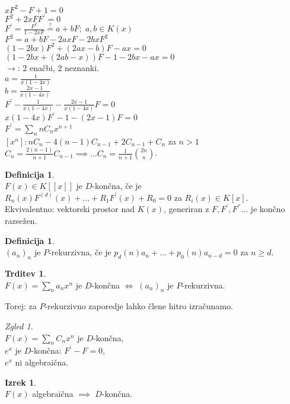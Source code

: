 \documentclass[a4paper, 12pt]{book}
\theoremstyle{definition}
\newtheorem{defn}[counter]{Definicija}
\newtheorem{claim}[counter]{Trditev}
\newtheorem{theorem}[counter]{Izrek}
\theoremstyle{remark}
\newtheorem*{exmp}{Zgled}
\begin{document}
$x F^2 - F + 1 = 0$ \\
$F^2 + 2 x F F^{'} = 0$ \\
$F^{'} = \frac{F^2}{1 - 2 x F} \stackrel{?}{=} a + bF; \; a, b \in K(x)$ \\
$F^2 = a + b F - 2 a x F - 2 b x F^2$ \\
$(1 - 2 b x) F^2 + (2 a x - b) F - a x = 0$ \\
$(1 - 2 b x + (2 a b - x)) F - 1 - 2 b x - a x = 0$ \\
$\to$: 2 enačbi, 2 neznanki. \\
$a = \frac{1}{x (1-4x)}$ \\
$b = \frac{2x-1}{x (1-4x)}$ \\
$F^{'} - \frac{1}{x (1-4x)} - \frac{2x-1}{x (1-4x)} F = 0$ \\
$x (1-4x) F^{'} - 1 - (2x-1) F = 0$ \\
$F^{'} = \sum_n n C_n x^{n+1}$ \\
$[x^n]: n C_n - 4 (n-1) C_{n-1} + 2 C_{n-1} + C_n$ za $n > 1$ \\
$C_n = \frac{2 (n-1)}{n+1} C_{n-1} \implies \dots C_n = \frac{1}{n+1} \binom{2n}{n}$.
\begin{defn} \text{} \\
  $F(x) \in K[[x]]$ je $D$-končna, če je \\
  $R_n(x) F^{(d)}(x) + \dots + R_1 F^{'}(x) + R_0 = 0$ za $R_i(x) \in K[x]$. \\
  Ekvivalentno: vektorski prostor nad $K(x)$, generiran z $F, F^{'}, F^{''} \dots$ je končno razsežen.
\end{defn}
\begin{defn} \text{} \\
  $(a_n)_n$ je $P$-rekurzivna, če je $p_d(n) a_n + \dots + p_0(n) a_{n-d} = 0$ za $n \geq d$.
\end{defn}
\begin{claim} \text{} \\
  $F(x) = \sum_n a_n x^n$ je $D$-končna $\iff \; (a_n)_n$ je $P$-rekurzivna.
\end{claim}
Torej: za $P$-rekurzivno zaporedje lahko člene hitro izračunamo.
\begin{exmp} \text{} \\
  $F(x) = \sum_n C_n x^n$ je $D$-končna, \\
  $e^x$ je $D$-končna: $F^{'} - F = 0$, \\
  $e^x$ ni algebraična.
\end{exmp}
\begin{theorem} \text{} \\
  $F(x)$ algebraična $\implies \; D$-končna.
\end{theorem}
\end{document}
